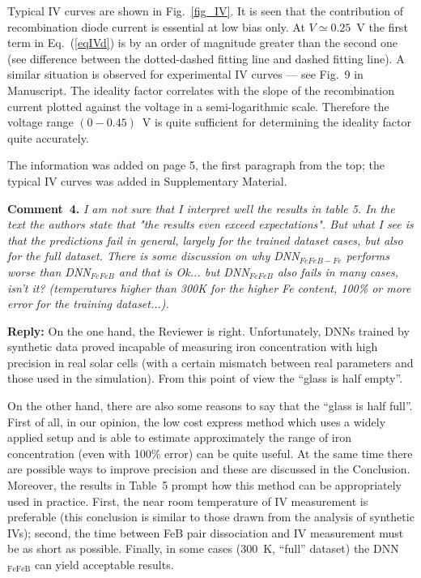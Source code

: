 \documentclass[num-refs]{wiley-article} %
\begin{document}
Typical IV curves are shown in Fig.~\ref{fig_IV}.
It is seen that the contribution of recombination diode current is essential at low bias only.
At $V\simeq 0.25$~V the first term in Eq.~(\ref{eqIVd}) is
by an order of magnitude greater than the second one
(see difference between the dotted-dashed fitting line and dashed fitting line).
A similar situation is observed for
experimental IV curves --- see Fig.~9 in Manuscript.
The ideality factor correlates with  the slope of the recombination current
plotted against the voltage in a semi-logarithmic scale.
Therefore the voltage range $(0-0.45)$~V is quite sufficient for determining the ideality factor quite accurately.


The information was added on page 5, the first paragraph from the top;
the typical IV curves was added in Supplementary Material.


\vspace{1cm}
\noindent
\textcolor[rgb]{0.00,0.50,1.00}{\textbf{Comment~4.}}
\emph{I am not sure that I interpret well the results in table 5.
In the text the authors state that "the results even exceed expectations".
But what I see is that the predictions fail in general, largely for the trained dataset cases,
but also for the full dataset.
There is some discussion on why DNN$_{FeFeB-Fe}$ performs worse than DNN$_{FeFeB}$
and that is Ok... but DNN$_{FeFeB}$ also fails in many cases, isn't it?
(temperatures higher than 300K for the higher Fe content,
100\% or more error for the training dataset...).
}

\vspace{0.5cm}
\noindent
\textcolor[rgb]{0.51,0.00,0.00}{\textbf{Reply:}}
On the one hand, the Reviewer is right.
Unfortunately, DNNs  trained by synthetic data
proved incapable of measuring iron concentration
with high precision in real solar cells
(with a certain mismatch between real parameters and those used in the simulation).
From this point of view the ``glass is half empty''.

On the other hand, there are also some reasons
to say that the ``glass is half full''.
First of all, in our opinion,
the low cost express method which uses a widely applied setup and is able
to estimate approximately the range of iron concentration
(even with 100\% error) can be quite useful.
At the same time there are possible ways to improve precision  and these are discussed in the Conclusion.
Moreover, the results in Table~5 prompt how this method can be appropriately used in practice.
First, the near room temperature of IV measurement is preferable
(this conclusion is similar to those drawn from the analysis of synthetic IVs);
second, the time between FeB pair dissociation and IV measurement must be as short as possible.
Finally, in some cases (300~K, ``full'' dataset) the DNN$_\mathrm{FeFeB}$ can yield acceptable results.
\end{document}
